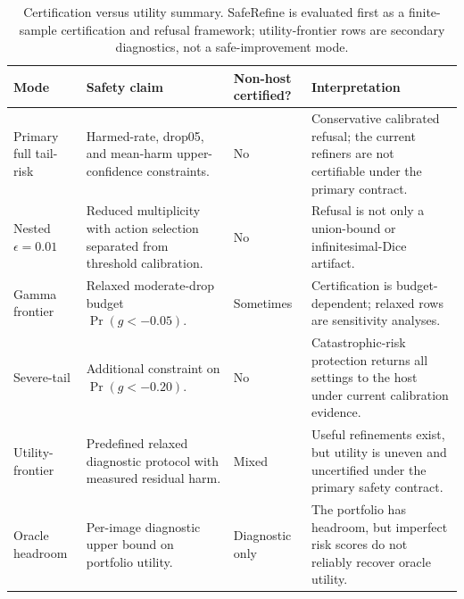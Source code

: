 \begin{table}[t]
\centering
\small
\caption{Certification versus utility summary. SafeRefine is evaluated first as a finite-sample certification and refusal framework; utility-frontier rows are secondary diagnostics, not a safe-improvement mode.}
\label{tab:certification_vs_utility}
\begin{tabular}{p{}p{}p{}p{}}
\toprule
Mode & Safety claim & Non-host certified? & Interpretation \\
\midrule
Primary full tail-risk & Harmed-rate, drop05, and mean-harm upper-confidence constraints. & No & Conservative calibrated refusal; the current refiners are not certifiable under the primary contract. \\
Nested $\epsilon=0.01$ & Reduced multiplicity with action selection separated from threshold calibration. & No & Refusal is not only a union-bound or infinitesimal-Dice artifact. \\
Gamma frontier & Relaxed moderate-drop budget $\Pr(g<-0.05)$. & Sometimes & Certification is budget-dependent; relaxed rows are sensitivity analyses. \\
Severe-tail & Additional constraint on $\Pr(g<-0.20)$. & No & Catastrophic-risk protection returns all settings to the host under current calibration evidence. \\
Utility-frontier & Predefined relaxed diagnostic protocol with measured residual harm. & Mixed & Useful refinements exist, but utility is uneven and uncertified under the primary safety contract. \\
Oracle headroom & Per-image diagnostic upper bound on portfolio utility. & Diagnostic only & The portfolio has headroom, but imperfect risk scores do not reliably recover oracle utility. \\
\bottomrule
\end{tabular}
\end{table}
